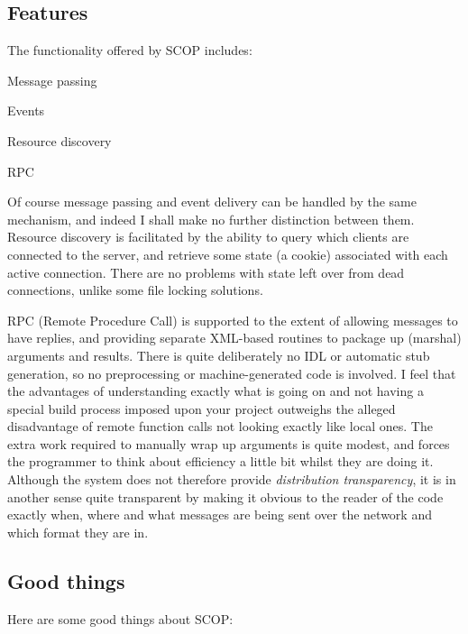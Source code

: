 \documentclass[12pt,a4paper,twoside]{article}
\renewcommand{\_}{\texttt{\symbol{95}}}
\begin{document}
\subsection{Features}

The functionality offered by SCOP includes:

\begin{bulletlist}
\item Message passing
\item Events
\item Resource discovery
\item RPC
\end{bulletlist}

Of course message passing and event delivery can be handled by the same
mechanism, and indeed I shall make no further distinction between
them. Resource discovery is facilitated by the ability to query which
clients are connected to the server, and retrieve some state (a cookie)
associated with each active connection. There are no problems with
state left over from dead connections, unlike some file locking
solutions.

RPC (Remote Procedure Call) is supported to the extent of
allowing messages to have replies, and providing separate XML-based
routines to package up (marshal) arguments and results. There is quite
deliberately no IDL or automatic stub generation, so no
preprocessing or machine-generated code is involved. I feel that the
advantages of understanding exactly what is going on and not having a
special build process imposed upon your project outweighs the alleged
disadvantage of remote function calls not looking exactly like local
ones. The extra work required to manually wrap up arguments is quite
modest, and forces the programmer to think about efficiency a little
bit whilst they are doing it. Although the system does not therefore
provide \textit{distribution transparency}, it is in another sense
quite transparent by making it obvious to the reader of the code
exactly when, where and what messages are being sent over the network
and which format they are in.

\subsection{Good things}

Here are some good things about SCOP:
\end{document}
